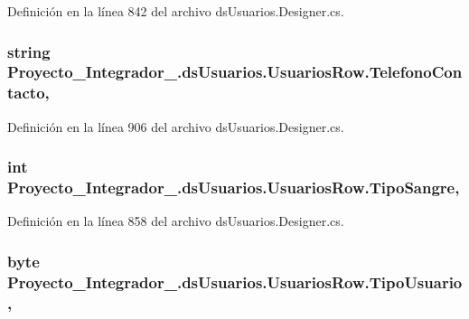 Definición en la línea 842 del archivo ds\-Usuarios.\-Designer.\-cs.

\hypertarget{class_proyecto___integrador__3_1_1ds_usuarios_1_1_usuarios_row_a0a97576bc8d3b21e8e6c4f2554759fa0}{
\subsubsection[{Telefono\-Contacto}]{\setlength{\rightskip}{0pt plus 5cm}string Proyecto\-\_\-\-Integrador\-\_.\-ds\-Usuarios.\-Usuarios\-Row.\-Telefono\-Contacto\hspace{0.3cm}{\ttfamily [get]}, {\ttfamily [set]}}}\label{class_proyecto___integrador__3_1_1ds_usuarios_1_1_usuarios_row_a0a97576bc8d3b21e8e6c4f2554759fa0}


Definición en la línea 906 del archivo ds\-Usuarios.\-Designer.\-cs.

\hypertarget{class_proyecto___integrador__3_1_1ds_usuarios_1_1_usuarios_row_a1ca1a500a2d31c6c84e6faa942815804}{
\subsubsection[{Tipo\-Sangre}]{\setlength{\rightskip}{0pt plus 5cm}int Proyecto\-\_\-\-Integrador\-\_.\-ds\-Usuarios.\-Usuarios\-Row.\-Tipo\-Sangre\hspace{0.3cm}{\ttfamily [get]}, {\ttfamily [set]}}}\label{class_proyecto___integrador__3_1_1ds_usuarios_1_1_usuarios_row_a1ca1a500a2d31c6c84e6faa942815804}


Definición en la línea 858 del archivo ds\-Usuarios.\-Designer.\-cs.

\hypertarget{class_proyecto___integrador__3_1_1ds_usuarios_1_1_usuarios_row_ab4f44ba81813ff94a806d2cf0ff99415}{
\subsubsection[{Tipo\-Usuario}]{\setlength{\rightskip}{0pt plus 5cm}byte Proyecto\-\_\-\-Integrador\-\_.\-ds\-Usuarios.\-Usuarios\-Row.\-Tipo\-Usuario\hspace{0.3cm}{\ttfamily [get]}, {\ttfamily [set]}}}\label{class_proyecto___integrador__3_1_1ds_usuarios_1_1_usuarios_row_ab4f44ba81813ff94a806d2cf0ff99415}


